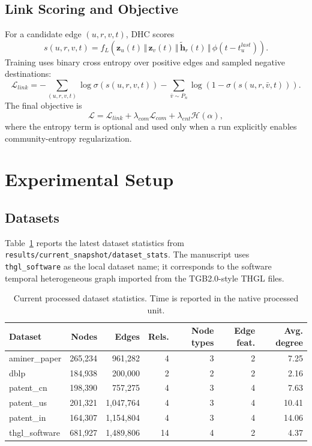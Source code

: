 \documentclass[runningheads]{llncs}
\begin{document}
\subsection{Link Scoring and Objective}
For a candidate edge $(u,r,v,t)$, DHC scores
\begin{equation}
s(u,r,v,t)=f_L\left(\mathbf{z}_u(t)\,\Vert\,\mathbf{z}_v(t)\,\Vert\,\tilde{\mathbf{h}}_r(t)\,\Vert\,\phi(t-t_u^{last})\right).
\end{equation}
Training uses binary cross entropy over positive edges and sampled negative destinations:
\begin{equation}
\mathcal{L}_{link}= -\sum_{(u,r,v,t)}\log\sigma(s(u,r,v,t))-\sum_{\bar{v}\sim P_n}\log(1-\sigma(s(u,r,\bar{v},t))).
\end{equation}
The final objective is
\begin{equation}
\mathcal{L}=\mathcal{L}_{link}+\lambda_{com}\mathcal{L}_{com}+\lambda_{ent}\mathcal{H}(\alpha),
\end{equation}
where the entropy term is optional and used only when a run explicitly enables community-entropy regularization.

\section{Experimental Setup}
\subsection{Datasets}
Table~\ref{tab:data_stats} reports the latest dataset statistics from \texttt{results/current\_snapshot/dataset\_stats}. The manuscript uses \texttt{thgl\_software} as the local dataset name; it corresponds to the software temporal heterogeneous graph imported from the TGB2.0-style THGL files.

\begin{table}[t]
\centering
\caption{Current processed dataset statistics. Time is reported in the native processed unit.}
\label{tab:data_stats}
\scriptsize
\setlength{\tabcolsep}{4pt}
\begin{tabular}{lrrrrrr}
\toprule
Dataset & Nodes & Edges & Rels. & Node types & Edge feat. & Avg. degree \\
\midrule
aminer\_paper & 265,234 & 961,282 & 4 & 3 & 2 & 7.25 \\
dblp & 184,938 & 200,000 & 2 & 2 & 2 & 2.16 \\
patent\_cn & 198,390 & 757,275 & 4 & 3 & 4 & 7.63 \\
patent\_us & 201,321 & 1,047,764 & 4 & 3 & 4 & 10.41 \\
patent\_in & 164,307 & 1,154,804 & 4 & 3 & 4 & 14.06 \\
thgl\_software & 681,927 & 1,489,806 & 14 & 4 & 2 & 4.37 \\
\bottomrule
\end{tabular}
\end{table}
\end{document}
